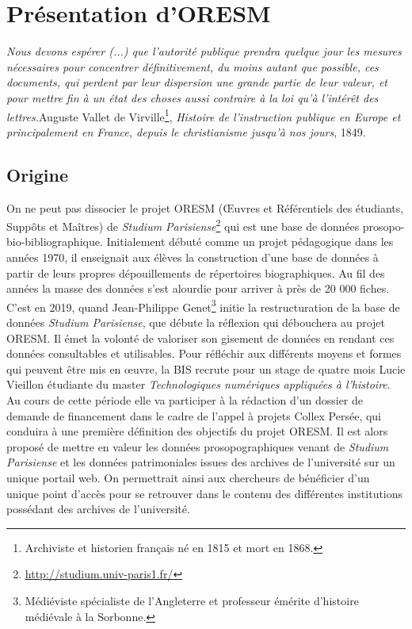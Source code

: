 \chapter{Présentation d'ORESM}
\og \textit{Nous devons espérer (...) que l'autorité publique prendra quelque jour les mesures nécessaires pour concentrer définitivement, du moins autant que possible, ces documents, qui perdent par leur dispersion une grande partie de leur valeur, et pour mettre fin à un état des choses aussi contraire à la loi qu'à l'intérêt des lettres.}\fg  Auguste Vallet de Virville\footnote{Archiviste et historien français né en 1815 et mort en 1868.}, \textit{Histoire de l'instruction publique en Europe et principalement en France, depuis le christianisme jusqu'à nos jours}, 1849.
\section{Origine}
On ne peut pas dissocier le projet ORESM (Œuvres et Référentiels des étudiants, Suppôts et Maîtres) de \textit{Studium Parisiense}\footnote{\href{http://studium.univ-paris1.fr/}{http://studium.univ-paris1.fr/}} qui est une base de données prosopo-bio-bibliographique. Initialement débuté comme un projet pédagogique dans les années 1970, il enseignait aux élèves la construction d'une base de données à partir de leurs propres dépouillements de répertoires biographiques. Au fil des années la masse des données s'est alourdie pour arriver à près de 20 000 fiches. C'est en 2019, quand Jean-Philippe Genet\footnote{Médiéviste spécialiste de l’Angleterre et professeur émérite d’histoire médiévale à la Sorbonne.} initie la restructuration de la base de données \textit{Studium Parisiense}, que débute la réflexion qui débouchera au projet ORESM. Il émet la volonté de valoriser son gisement de données en rendant ces données consultables et utilisables. Pour réfléchir aux différents moyens et formes qui peuvent être mis en œuvre, la BIS recrute pour un stage de quatre mois Lucie Vieillon étudiante du master \og\textit{Technologiques numériques appliquées à l'histoire}\fg. Au cours de cette période elle va participer à la rédaction d'un dossier de demande de financement dans le cadre de l'appel à projets Collex Persée, qui conduira à une première définition des objectifs du projet ORESM. Il est alors proposé de mettre en valeur les données prosopographiques venant de \textit{Studium Parisiense} et les données patrimoniales issues des archives de l'université sur un unique portail web. On permettrait ainsi aux chercheurs de bénéficier d'un unique point d'accès pour se retrouver dans le contenu des différentes institutions possédant des archives de l'université. 
